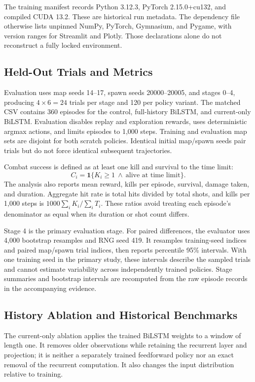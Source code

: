 \documentclass[conference]{IEEEtran}
\begin{document}
The training manifest records Python 3.12.3, PyTorch 2.15.0+cu132, and compiled CUDA 13.2. These are historical run metadata. The dependency file otherwise lists unpinned NumPy, PyTorch, Gymnasium, and Pygame, with version ranges for Streamlit and Plotly. Those declarations alone do not reconstruct a fully locked environment.

\subsection{Held-Out Trials and Metrics}
Evaluation uses map seeds 14--17, spawn seeds 20000--20005, and stages 0--4, producing $4\times6=24$ trials per stage and 120 per policy variant. The matched CSV contains 360 episodes for the control, full-history BiLSTM, and current-only BiLSTM. Evaluation disables replay and exploration rewards, uses deterministic argmax actions, and limits episodes to 1,000 steps. Training and evaluation map sets are disjoint for both scratch policies. Identical initial map/spawn seeds pair trials but do not force identical subsequent trajectories.

Combat success is defined as at least one kill and survival to the time limit:
\begin{equation}
C_i=\mathbf{1}\{K_i\ge1\ \land\ \text{alive at time limit}\}.
\end{equation}
The analysis also reports mean reward, kills per episode, survival, damage taken, and duration. Aggregate hit rate is total hits divided by total shots, and kills per 1,000 steps is $1000\sum_i K_i/\sum_i T_i$. These ratios avoid treating each episode's denominator as equal when its duration or shot count differs.

Stage 4 is the primary evaluation stage. For paired differences, the evaluator uses 4,000 bootstrap resamples and RNG seed 419. It resamples training-seed indices and paired map/spawn trial indices, then reports percentile 95\% intervals. With one training seed in the primary study, these intervals describe the sampled trials and cannot estimate variability across independently trained policies. Stage summaries and bootstrap intervals are recomputed from the raw episode records in the accompanying evidence.

\subsection{History Ablation and Historical Benchmarks}
The current-only ablation applies the trained BiLSTM weights to a window of length one. It removes older observations while retaining the recurrent layer and projection; it is neither a separately trained feedforward policy nor an exact removal of the recurrent computation. It also changes the input distribution relative to training.
\end{document}

